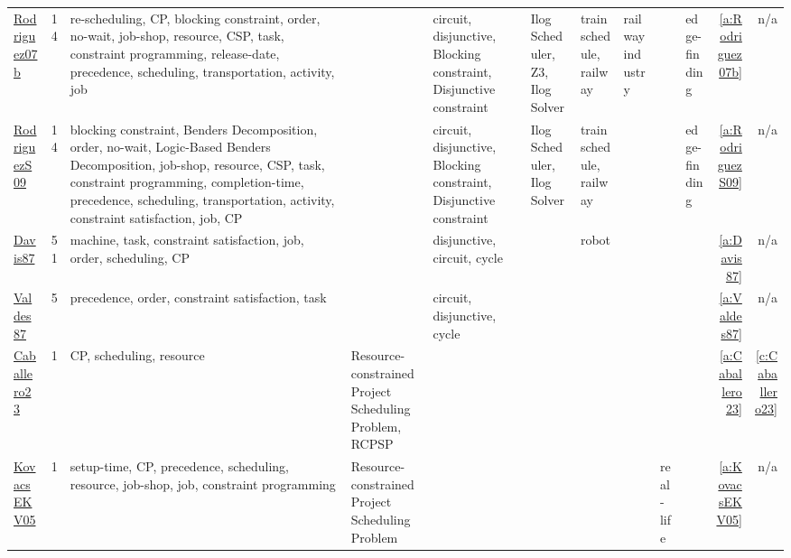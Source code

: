 {\begin{longtable}{>{\raggedright\arraybackslash}p{3cm}r>{\raggedright\arraybackslash}p{4cm}p{1.5cm}p{2cm}p{1.5cm}p{1.5cm}p{1.5cm}p{1.5cm}p{2cm}p{1.5cm}rr}
\href{../works/Rodriguez07b.pdf}{Rodriguez07b}~\cite{Rodriguez07b} & 14 & re-scheduling, CP, blocking constraint, order, no-wait, job-shop, resource, CSP, task, constraint programming, release-date, precedence, scheduling, transportation, activity, job &  & circuit, disjunctive, Blocking constraint, Disjunctive constraint &  & Ilog Scheduler, Z3, Ilog Solver & train schedule, railway & railway industry &  & edge-finding & \ref{a:Rodriguez07b} & n/a\\
\href{../works/RodriguezS09.pdf}{RodriguezS09}~\cite{RodriguezS09} & 14 & blocking constraint, Benders Decomposition, order, no-wait, Logic-Based Benders Decomposition, job-shop, resource, CSP, task, constraint programming, completion-time, precedence, scheduling, transportation, activity, constraint satisfaction, job, CP &  & circuit, disjunctive, Blocking constraint, Disjunctive constraint &  & Ilog Scheduler, Ilog Solver & train schedule, railway &  &  & edge-finding & \ref{a:RodriguezS09} & n/a\\
\href{../works/Davis87.pdf}{Davis87}~\cite{Davis87} & 51 & machine, task, constraint satisfaction, job, order, scheduling, CP &  & disjunctive, circuit, cycle &  &  & robot &  &  &  & \ref{a:Davis87} & n/a\\
\href{../works/Valdes87.pdf}{Valdes87}~\cite{Valdes87} & 5 & precedence, order, constraint satisfaction, task &  & circuit, disjunctive, cycle &  &  &  &  &  &  & \ref{a:Valdes87} & n/a\\
\href{../works/Caballero23.pdf}{Caballero23}~\cite{Caballero23} & 1 & CP, scheduling, resource & Resource-constrained Project Scheduling Problem, RCPSP &  &  &  &  &  &  &  & \ref{a:Caballero23} & \ref{c:Caballero23}\\
\href{../works/KovacsEKV05.pdf}{KovacsEKV05}~\cite{KovacsEKV05} & 1 & setup-time, CP, precedence, scheduling, resource, job-shop, job, constraint programming & Resource-constrained Project Scheduling Problem &  &  &  &  &  & real-life &  & \ref{a:KovacsEKV05} & n/a\\
\end{longtable}
}

